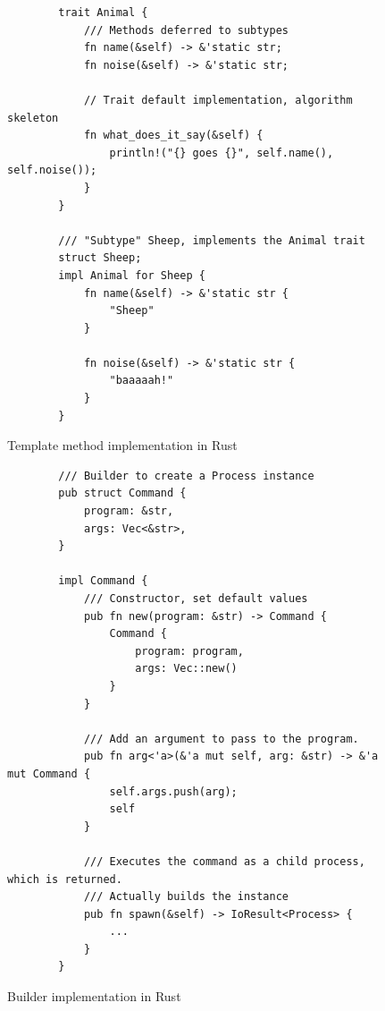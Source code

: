 \documentclass[conference]{IEEEtran}
\begin{document}
\begin{figure}[btp]
    \begin{verbatim}
        trait Animal {
            /// Methods deferred to subtypes
            fn name(&self) -> &'static str;
            fn noise(&self) -> &'static str;

            // Trait default implementation, algorithm skeleton
            fn what_does_it_say(&self) {
                println!("{} goes {}", self.name(), self.noise());
            }
        }

        /// "Subtype" Sheep, implements the Animal trait
        struct Sheep;
        impl Animal for Sheep {
            fn name(&self) -> &'static str {
                "Sheep"
            }

            fn noise(&self) -> &'static str {
                "baaaaah!"
            }
        }
    \end{verbatim}
    \caption{Template method implementation in Rust}
    \label{fig:template-impl}
\end{figure}

\begin{figure}[btp]
    \begin{verbatim}
        /// Builder to create a Process instance
        pub struct Command {
            program: &str,
            args: Vec<&str>,
        }

        impl Command {
            /// Constructor, set default values
            pub fn new(program: &str) -> Command {
                Command {
                    program: program,
                    args: Vec::new()
                }
            }

            /// Add an argument to pass to the program.
            pub fn arg<'a>(&'a mut self, arg: &str) -> &'a mut Command {
                self.args.push(arg);
                self
            }

            /// Executes the command as a child process, which is returned.
            /// Actually builds the instance
            pub fn spawn(&self) -> IoResult<Process> {
                ...
            }
        }
    \end{verbatim}
    \caption{Builder implementation in Rust}
    \label{fig:builder-impl}
\end{figure}
\end{document}
